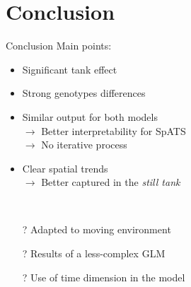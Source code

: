 \documentclass[]{beamer}
\begin{document}
\section{Conclusion}
\begin{frame}{Conclusion}
Main points:
\begin{itemize}
	\item Significant tank effect
	\item Strong genotypes differences
	\item Similar output for both models\\
	$\rightarrow$ Better interpretability for SpATS\\
	$\rightarrow$ No iterative process
	\item Clear spatial trends\\
	$\rightarrow$ Better captured in the \emph{still tank}
\end{itemize}
~\\
\begin{itemize}
	\item[?] Adapted to moving environment
	\item[?] Results of a less-complex GLM
	\item[?] Use of time dimension in the model
\end{itemize}

\end{frame}
\end{document}
